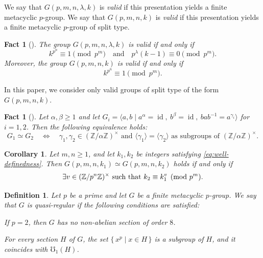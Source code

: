 \documentclass[onecolumn]{article}
\numberwithin{equation}{section}
\theoremstyle{mytheoremstyle}
\newtheorem{defi}[thm]{Definition}
\newtheorem{fac}[thm]{Fact}
\newtheorem{cor}[thm]{Corollary}
\DeclareMathOperator{\id}{\mathrm{id}}
\begin{document}
We say that $G(p,m,n,\lambda,k)$ is \emph{valid} if this presentation yields a finite metacyclic $p$-group.
We say that $G(p,m,n,k)$ is \emph{valid} if this presentation yields a finite metacyclic $p$-group of split type.

\begin{fac}[\cite{Hempel2000}]
The group $G(p,m,n,\lambda,k)$ is valid if and only if
\[
k^{p^{n}} \equiv 1 \pmod{p^{m}}
\quad\text{and}\quad
p^{\lambda}(k-1) \equiv 0 \pmod{p^{m}}.
\]
Moreover, the group $G(p,m,n,k)$ is valid if and only if
\begin{equation}\label{eq:well-definedness}
k^{p^{n}} \equiv 1 \pmod{p^{m}}.
\end{equation}
\end{fac}







In this paper, we consider only valid groups of split type of the form $G(p,m,n,k)$.



\begin{fac}[\cite{HumphriesSkabelund2015}]\label{fac:split-meta-iso}
Let $\alpha,\beta\ge 1$ and let $ G_i = \langle a,b \mid a^{\alpha}=\id,\ b^{\beta}=\id,\ bab^{-1} = a^{\gamma_i}\rangle$ for $i=1,2$. Then the following equivalence holds:
\[
  G_1 \simeq G_2
  \quad\Longleftrightarrow\quad
  \gamma_1,\gamma_2\in (\mathbb{Z}/\alpha\mathbb{Z})^{\times}
  \text{ and }
  \langle \gamma_1\rangle = \langle \gamma_2\rangle
  \text{ as subgroups of } (\mathbb{Z}/\alpha\mathbb{Z})^{\times}.
\]

\end{fac}

\begin{cor}\label{cor:isom-Gpmn}
Let $m,n\ge 1$, and let $k_{1},k_{2}$ be integers satisfying
\eqref{eq:well-definedness}.
Then $G(p,m,n,k_{1})\simeq G(p,m,n,k_{2})$ holds if and only if
\begin{equation}\label{eq:同型の条件メタサイクル}
  \exists v\in (\mathbb{Z}/p^{n}\mathbb{Z})^{\times}
  \textup{ such that }
  k_{2}\equiv k_{1}^{v} \pmod{p^{m}}.
\end{equation}
\end{cor}


\begin{defi}\label{def:quasi-regular}
Let $p$ be a prime and let $G$ be a finite metacyclic $p$-group.
We say that $G$ is \emph{quasi-regular} if the following conditions are satisfied:
\begin{description}[labelwidth=0.7cm]
  \item[\textup{(QR1)}]
    If $p=2$, then $G$ has no non-abelian section of order $8$.
  \item[\textup{(QR2)}]
    For every section $H$ of $G$, the set $\{\,x^{p}\mid x\in H\,\}$ is a subgroup of $H$,
    and it coincides with $\mho_{1}(H)$.
\end{description}
\end{defi}
\end{document}
